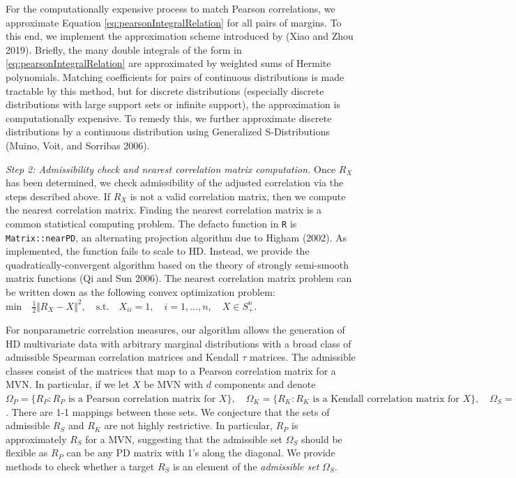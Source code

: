 \documentclass{article}
\begin{document}
For the computationally expensive process to match Pearson correlations,
we approximate Equation \ref{eq:pearsonIntegralRelation} for all pairs
of margins. To this end, we implement the approximation scheme
introduced by (Xiao and Zhou 2019). Briefly, the many double integrals
of the form in \ref{eq:pearsonIntegralRelation} are approximated by
weighted sums of Hermite polynomials. Matching coefficients for pairs of
continuous distributions is made tractable by this method, but for
discrete distributions (especially discrete distributions with large
support sets or infinite support), the approximation is computationally
expensive. To remedy this, we further approximate discrete distributions
by a continuous distribution using Generalized S-Distributions (Muino,
Voit, and Sorribas 2006).

\emph{Step 2: Admissibility check and nearest correlation matrix
computation.} Once \(R_X\) has been determined, we check admissibility
of the adjusted correlation via the steps described above. If \(R_X\) is
not a valid correlation matrix, then we compute the nearest correlation
matrix. Finding the nearest correlation matrix is a common statistical
computing problem. The defacto function in \texttt{R} is
\texttt{Matrix::nearPD}, an alternating projection algorithm due to
Higham (2002). As implemented, the function fails to scale to HD.
Instead, we provide the quadratically-convergent algorithm based on the
theory of strongly semi-smooth matrix functions (Qi and Sun 2006). The
nearest correlation matrix problem can be written down as the following
convex optimization problem:
\(\mathrm{min} \quad \frac{1}{2} \Vert R_X - X \Vert^2, \quad \mathrm{s.t.} \quad X_{ii} = 1, \quad i = 1, \ldots , n, \quad X \in S_{+}^{n}\).

For nonparametric correlation measures, our algorithm allows the
generation of HD multivariate data with arbitrary marginal distributions
with a broad class of admissible Spearman correlation matrices and
Kendall \(\tau\) matrices. The admissible classes consist of the
matrices that map to a Pearson correlation matrix for a MVN. In
particular, if we let \(X\) be MVN with \(d\) components and denote
\(\Omega_P = \{ R_P : R_P \textrm{ is a Pearson correlation matrix for } X \}, \quad \Omega_K = \{ R_K : R_K \textrm{ is a Kendall correlation matrix for } X \}, \quad \Omega_S = \{ R_S : R_S \textrm{ is a Spearman correlation matrix for } X \}\).
There are 1-1 mappings between these sets. We conjecture that the sets
of admissible \(R_S\) and \(R_K\) are not highly restrictive. In
particular, \(R_P\) is approximately \(R_S\) for a MVN, suggesting that
the admissible set \(\Omega_S\) should be flexible as \(R_P\) can be any
PD matrix with 1's along the diagonal. We provide methods to check
whether a target \(R_S\) is an element of the \emph{admissible set}
\(\Omega_S\).
\end{document}
